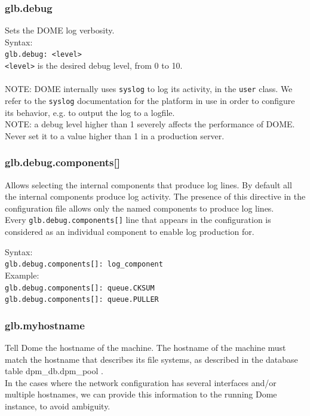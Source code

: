 \documentclass[a4paper,10pt]{scrreprt}
\begin{document}
\subsubsection{glb.debug}

 Sets the DOME log verbosity.\\

 Syntax:\\

\lstinline"glb.debug: <level>"\\

\lstinline"<level>" is the desired debug level, from 0 to 10.\\ \\
 NOTE: DOME internally uses \lstinline"syslog" to log its activity, in the \lstinline"user" class. We refer to the \lstinline"syslog" documentation for the platform in use in order to configure its behavior, e.g. to output the log to a logfile.\\

 NOTE: a debug level higher than 1 severely affects the performance of DOME. Never set it to a value higher than 1 in a production server.\\

\subsubsection{glb.debug.components[]}

 Allows selecting the internal components that produce log lines. By default all the internal components produce log activity. The presence of this directive in the configuration file allows only the named components to produce log lines.\\

 Every \lstinline"glb.debug.components[]" line that appears in the configuration is considered as an individual component to enable log production for.

 Syntax:\\

\lstinline"glb.debug.components[]: log_component"\\

 Example:\\
\lstinline"glb.debug.components[]: queue.CKSUM"\\
\lstinline"glb.debug.components[]: queue.PULLER"\\

\subsubsection{glb.myhostname}
Tell Dome the hostname of the machine. The hostname of the machine must match the hostname that describes its file systems, as described in the database table dpm\_db.dpm\_pool .\\
In the cases where the network configuration has several interfaces and/or multiple hostnames, we can provide this information to the running Dome instance, to avoid ambiguity.\\
\end{document}
